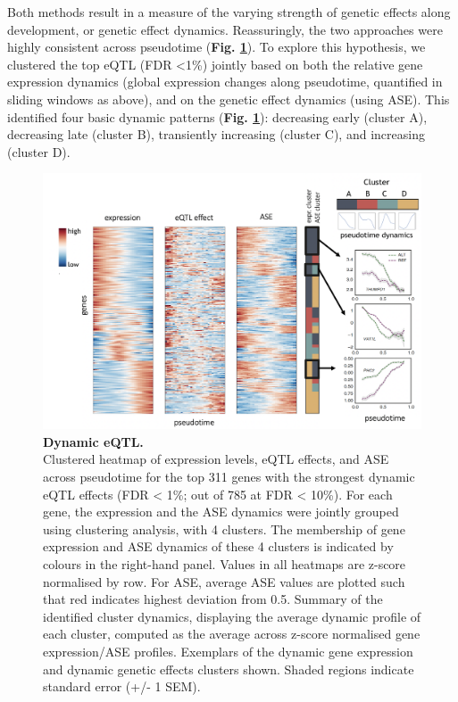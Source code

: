 Both methods result in a measure of the varying strength of genetic effects along development, or genetic effect dynamics. 
Reassuringly, the two approaches were highly consistent across pseudotime (\textbf{Fig. \ref{fig:endodiff_dynamic_eqtl}}).
To explore this hypothesis, we clustered the top eQTL (FDR <1\%) jointly based on both the relative gene expression dynamics (global expression changes along pseudotime, quantified in sliding windows as above), and on the genetic effect dynamics (using ASE). 
This identified four basic dynamic patterns (\textbf{Fig. \ref{fig:endodiff_dynamic_eqtl}}): decreasing early (cluster A), decreasing late (cluster B), transiently increasing (cluster C), and increasing (cluster D). 
\begin{figure}[htbp]
\centering
\includegraphics[width=15.5cm]{Chapter4/Fig/endodiff_pseudo_heatmap.png}
\caption[Dynamic eQTL]{\textbf{Dynamic eQTL.}\\
Clustered heatmap of expression levels, eQTL effects, and ASE across pseudotime for the top 311 genes with the strongest dynamic eQTL effects (FDR < 1\%; out of 785 at FDR < 10\%). 
For each gene, the expression and the ASE dynamics were jointly grouped using clustering analysis, with 4 clusters. The membership of gene expression and ASE dynamics of these 4 clusters is indicated by colours in the right-hand panel. Values in all heatmaps are z-score normalised by row. 
For ASE, average ASE values are plotted such that red indicates highest deviation from 0.5.
Summary of the identified cluster dynamics, displaying the average dynamic profile
of each cluster, computed as the average across z-score normalised gene expression/ASE profiles. 
Exemplars of the dynamic gene expression and dynamic genetic effects clusters shown.
Shaded regions indicate standard error (+/- 1 SEM).}
\label{fig:endodiff_dynamic_eqtl}
\end{figure}
